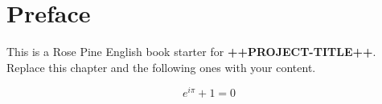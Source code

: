 \chapter*{Preface}

This is a Rose Pine English book starter for \textbf{++PROJECT-TITLE++}.
Replace this chapter and the following ones with your content.

\begin{formulabox}
\[
  e^{i\pi} + 1 = 0
\]
\end{formulabox}

